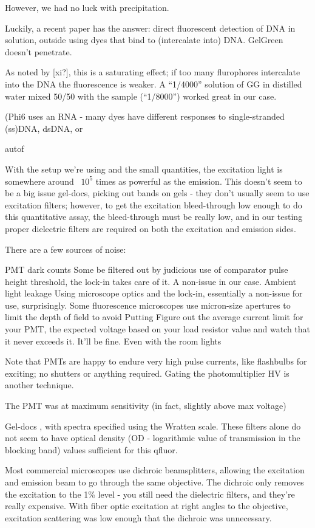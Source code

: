 \documentclass[paper.tex]{subfiles}
\begin{document}
However, we had no luck with precipitation.


Luckily, a recent paper has the answer: direct fluorescent detection of DNA in solution, outside using dyes that bind to (intercalate into) DNA. GelGreen doesn’t penetrate.



As noted by [xi?], this is a saturating effect; if too many flurophores intercalate into the DNA the fluorescence is weaker. A “1/4000” solution of GG in distilled water mixed 50/50 with the sample (“1/8000”) worked great in our case.

(Phi6 uses an RNA - many dyes have different responses to single-stranded (ss)DNA, dsDNA, or 


autof


With the setup we’re using and the small quantities, the excitation light is somewhere around ~$10^5$ times as powerful as the emission. This doesn’t seem to be a big issue gel-docs, picking out bands on gels - they don’t usually seem to use excitation filters; however, to get the excitation bleed-through low enough to do this quantitative assay, the bleed-through must be really low, and in our testing proper dielectric filters are required on both the excitation and emission sides. 

There are a few sources of noise:

PMT dark counts
Some be filtered out by judicious use of comparator pulse height threshold, the lock-in takes care of it. A non-issue in our case.
Ambient light leakage
Using microscope optics and the lock-in, essentially a non-issue for use, surprisingly. Some fluorescence microscopes use micron-size apertures to limit the depth of field to avoid Putting 
Figure out the average current limit for your PMT, the expected voltage based on your load resistor value and watch that it never exceeds it. It’ll be fine. Even with the room lights


Note that PMTs are happy to endure very high pulse currents, like flashbulbs for exciting; no shutters or anything required. Gating the photomultiplier HV is another technique.


The PMT was at maximum sensitivity (in fact, slightly above max voltage)

Gel-docs , with spectra specified using the Wratten scale. These filters alone do not seem to have optical density (OD - logarithmic value of transmission in the blocking band) values sufficient for this qfluor. 

Most commercial microscopes use dichroic beamsplitters, allowing the excitation and emission beam to go through the same objective. The dichroic only removes the excitation to the 1\% level - you still need the dielectric filters, and they’re really expensive. With fiber optic excitation at right angles to the objective, excitation scattering was low enough that the dichroic was unnecessary. 
\end{document}
